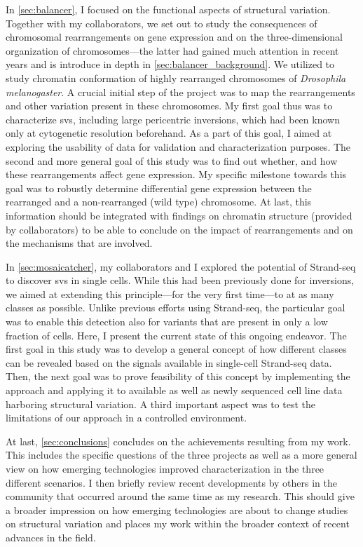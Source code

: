 In \cref{sec:balancer}, I focused on the functional aspects of structural variation.
Together with my collaborators, we set out to study the consequences of
chromosomal rearrangements on gene expression and on the three-dimensional
organization of chromosomes---the latter had gained much attention in recent
years and is introduce in depth in \cref{sec:balancer_background}. We utilized \hic
to study chromatin conformation of highly rearranged chromosomes of
\textit{Drosophila melanogaster}. A crucial initial step of the project was to
map the rearrangements and other variation present in these chromosomes. My
first goal thus was to characterize \acp{sv}, including large pericentric
inversions, which had been known only at cytogenetic resolution beforehand.
As a part of this goal, I aimed at exploring the usability of
\hic data for validation and characterization purposes. The second and more
general goal of this study was to find out whether, and how these rearrangements
affect gene expression. My specific milestone towards this goal was to robustly
determine differential gene expression between the rearranged and a
non-rearranged (wild type) chromosome. At last, this information should be
integrated with findings on chromatin structure (provided by collaborators) to
be able to conclude on the impact of rearrangements and on the mechanisms that
are involved.

In \cref{sec:mosaicatcher}, my collaborators and I explored the potential of
Strand-seq to discover \acp{sv} in single cells. While this had been previously
done for inversions, we aimed at extending this principle---for the very first
time---to at as many \sv classes as possible. Unlike previous efforts using Strand-seq,
the particular goal was to enable this detection also for variants that are present in only
a low fraction of cells.
Here, I present the current state of this ongoing endeavor. The first
goal in this study was to develop a general concept of how different \sv classes
can be revealed based on the signals available in single-cell Strand-seq data.
Then, the next goal was to prove feasibility of this concept by implementing the
approach and applying it to available as well as newly sequenced cell line data
harboring structural variation. A third important aspect was to test the
limitations of our approach in a controlled environment.

At last, \cref{sec:conclusions} concludes on the achievements resulting from my
work. This includes the specific questions of the three projects as well as a
more general view on how emerging technologies improved \sv characterization in
the three different scenarios. I then briefly review recent developments by others in
the community that occurred around the same time as my research. This should give a
broader impression on how emerging technologies are about to change studies on
structural variation and places my work within the broader context of recent
advances in the field.


